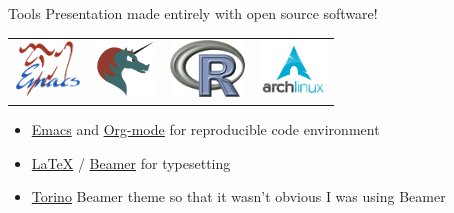 \documentclass[sans,aspectratio=169,presentation,bigger,fleqn]{beamer}
\begin{document}
\begin{frame}[label=sec-37]{Tools}
Presentation made entirely with open source software!

\begin{center}
\begin{center}
\begin{tabular}{llll}
\includegraphics[height=1.5cm]{./img/emacs.png} & \includegraphics[height=1.5cm]{./img/org-mode.png} & \includegraphics[height=1.5cm]{./img/r.png} & \includegraphics[height=1.5cm]{./img/arch.png}\\
\end{tabular}
\end{center}
\end{center}

\begin{itemize}
\item \href{http://www.gnu.org/software/emacs/}{Emacs} and \href{http://orgmode.org/}{Org-mode} for reproducible code environment
\item \href{http://www.latex-project.org/}{\LaTeX} / \href{http://www.ctan.org/tex-archive/macros/latex/contrib/beamer/}{Beamer} for typesetting
\item \href{http://blog.barisione.org/2007-09/torino-a-pretty-theme-for-latex-beamer/}{Torino} Beamer theme so that it wasn't obvious I was using Beamer
\end{itemize}
\end{frame}
\end{document}
